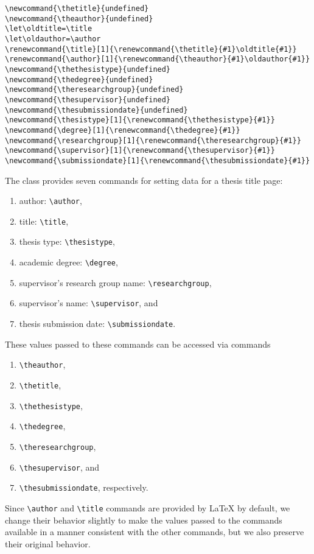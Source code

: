 \begin{verbatim}
\newcommand{\thetitle}{undefined}
\newcommand{\theauthor}{undefined}
\let\oldtitle=\title
\let\oldauthor=\author
\renewcommand{\title}[1]{\renewcommand{\thetitle}{#1}\oldtitle{#1}}
\renewcommand{\author}[1]{\renewcommand{\theauthor}{#1}\oldauthor{#1}}
\newcommand{\thethesistype}{undefined}
\newcommand{\thedegree}{undefined}
\newcommand{\theresearchgroup}{undefined}
\newcommand{\thesupervisor}{undefined}
\newcommand{\thesubmissiondate}{undefined}
\newcommand{\thesistype}[1]{\renewcommand{\thethesistype}{#1}}
\newcommand{\degree}[1]{\renewcommand{\thedegree}{#1}}
\newcommand{\researchgroup}[1]{\renewcommand{\theresearchgroup}{#1}}
\newcommand{\supervisor}[1]{\renewcommand{\thesupervisor}{#1}}
\newcommand{\submissiondate}[1]{\renewcommand{\thesubmissiondate}{#1}}
\end{verbatim}

\vspace*{-6pt} \noindent
The class provides seven commands for setting data for a thesis title page:
\begin{enumerate}
	\item author: \verb+\author+,
	\item title: \verb+\title+,
	\item thesis type: \verb+\thesistype+,
	\item academic degree: \verb+\degree+,
	\item supervisor's research group name: \verb+\researchgroup+,
	\item supervisor's name: \verb+\supervisor+, and
	\item thesis submission date: \verb+\submissiondate+.
\end{enumerate}
These values passed to these commands can be accessed via commands
\begin{enumerate}
	\item \verb+\theauthor+,
	\item \verb+\thetitle+,
	\item \verb+\thethesistype+,
	\item \verb+\thedegree+,
	\item \verb+\theresearchgroup+,
	\item \verb+\thesupervisor+, and
	\item \verb+\thesubmissiondate+, respectively.
\end{enumerate}
\noindent Since \verb+\author+ and \verb+\title+ commands are provided by
\LaTeX{} by default, we change their behavior slightly to make the values
passed to the commands available in a manner consistent with the other
commands, but we also preserve their original behavior.

